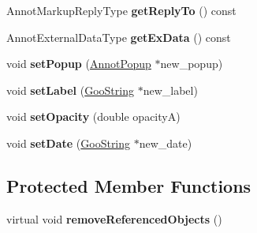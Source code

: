\begin{DoxyCompactItemize}
Annot\+Markup\+Reply\+Type {\bfseries get\+Reply\+To} () const
\item 
\mbox{\label{class_annot_markup_a945019035e07fb88db81e939bd916d6b}} 
Annot\+External\+Data\+Type {\bfseries get\+Ex\+Data} () const
\item 
\mbox{\label{class_annot_markup_ad13b7b0167d07253b344dcd2067b261d}} 
void {\bfseries set\+Popup} (\hyperlink{class_annot_popup}{Annot\+Popup} $\ast$new\+\_\+popup)
\item 
\mbox{\label{class_annot_markup_a33d46023b96034ae4eaf4f6145d4b5e9}} 
void {\bfseries set\+Label} (\hyperlink{class_goo_string}{Goo\+String} $\ast$new\+\_\+label)
\item 
\mbox{\label{class_annot_markup_a62a497e3beea10dc398885715479ab5d}} 
void {\bfseries set\+Opacity} (double opacityA)
\item 
\mbox{\label{class_annot_markup_a522e224e313a453c5f77f0eb1ad81a3e}} 
void {\bfseries set\+Date} (\hyperlink{class_goo_string}{Goo\+String} $\ast$new\+\_\+date)
\end{DoxyCompactItemize}
\subsection*{Protected Member Functions}
\begin{DoxyCompactItemize}
\item 
\mbox{\label{class_annot_markup_a5968431d6cd15a125cb575304fa4f5a0}} 
virtual void {\bfseries remove\+Referenced\+Objects} ()
\end{DoxyCompactItemize}
